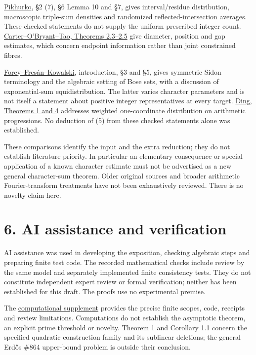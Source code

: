 \documentclass[11pt,a4paper]{article}
\begin{document}
\href{https://opikhurko.warwick.ac.uk/E/Pikhurko06dm.pdf}{Pikhurko}, §2 (7), §6 Lemma 10 and §7, gives interval/residue distribution, macroscopic triple-sum densities and randomized reflected-intersection averages. These checked statements do not supply the uniform prescribed integer count. \href{https://arxiv.org/pdf/2610.36207v1}{Carter--O'Bryant--Tao, Theorems 2.3--2.5} give diameter, position and gap estimates, which concern endpoint information rather than joint constrained fibres.

\href{https://arxiv.org/pdf/2301.12878v3}{Forey--Fresán--Kowalski}, introduction, §3 and §5, gives symmetric Sidon terminology and the algebraic setting of Bose sets, with a discussion of exponential-sum equidistribution. The latter varies character parameters and is not itself a statement about positive integer representatives at every target. \href{https://arxiv.org/pdf/2606.15041v2}{Ding, Theorems 1 and 4} addresses weighted one-coordinate distribution on arithmetic progressions. No deduction of (5) from these checked statements alone was established.

These comparisons identify the input and the extra reduction; they do not establish literature priority. In particular an elementary consequence or special application of a known character estimate must not be advertised as a new general character-sum theorem. Older original sources and broader arithmetic Fourier-transform treatments have not been exhaustively reviewed. There is no novelty claim here.

\section{6. AI assistance and verification}\label{ai-assistance-and-verification}

AI assistance was used in developing the exposition, checking algebraic steps and preparing finite test code. The recorded mathematical checks include review by the same model and separately implemented finite consistency tests. They do not constitute independent expert review or formal verification; neither has been established for this draft. The proofs use no experimental premise.

The \href{https://github.com/miyosep/erdos-864-c021/blob/main/manuscript/notes/c021_editorial_20261105/COMPUTATIONAL_SUPPLEMENT.md}{computational supplement} provides the precise finite scopes, code, receipts and review limitations. Computations do not establish the asymptotic theorem, an explicit prime threshold or novelty. Theorem 1 and Corollary 1.1 concern the specified quadratic construction family and its sublinear deletions; the general Erdős \#864 upper-bound problem is outside their conclusion.
\end{document}
